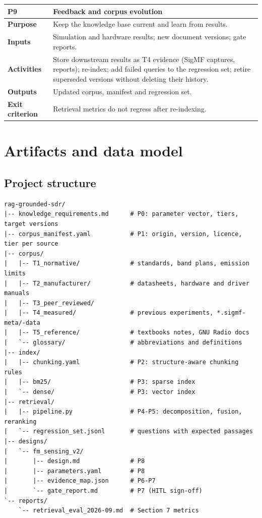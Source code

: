 \documentclass[11pt,a4paper]{article}
\begin{document}
\vspace{-2pt}
{\small
\begin{longtable}{>{\raggedright\arraybackslash}p{}>{\raggedright\arraybackslash}p{}}
\toprule
\rowcolor{headbg} \textbf{P9} & \textbf{Feedback and corpus evolution} \\
\midrule
\endfirsthead
\bottomrule
\endlastfoot
\textbf{Purpose} & Keep the knowledge base current and learn from results. \\ \arrayrulecolor{rulec}\hline\arrayrulecolor{black}
\textbf{Inputs} & Simulation and hardware results; new document versions; gate reports. \\ \arrayrulecolor{rulec}\hline\arrayrulecolor{black}
\textbf{Activities} & Store downstream results as T4 evidence (SigMF captures, reports); re-index; add failed queries to the regression set; retire superseded versions without deleting their history. \\ \arrayrulecolor{rulec}\hline\arrayrulecolor{black}
\textbf{Outputs} & Updated corpus, manifest and regression set. \\ \arrayrulecolor{rulec}\hline\arrayrulecolor{black}
\textbf{Exit criterion} & Retrieval metrics do not regress after re-indexing. \\
\end{longtable}
}
\vspace{-2pt}
\section{Artifacts and data model}
\subsection{Project structure}
\begin{lstlisting}
rag-grounded-sdr/
|-- knowledge_requirements.md      # P0: parameter vector, tiers, target versions
|-- corpus_manifest.yaml           # P1: origin, version, licence, tier per source
|-- corpus/
|   |-- T1_normative/              # standards, band plans, emission limits
|   |-- T2_manufacturer/           # datasheets, hardware and driver manuals
|   |-- T3_peer_reviewed/
|   |-- T4_measured/               # previous experiments, *.sigmf-meta/-data
|   |-- T5_reference/              # textbooks notes, GNU Radio docs
|   `-- glossary/                  # abbreviations and definitions
|-- index/
|   |-- chunking.yaml              # P2: structure-aware chunking rules
|   |-- bm25/                      # P3: sparse index
|   `-- dense/                     # P3: vector index
|-- retrieval/
|   |-- pipeline.py                # P4-P5: decomposition, fusion, reranking
|   `-- regression_set.jsonl       # questions with expected passages
|-- designs/
|   `-- fm_sensing_v2/
|       |-- design.md              # P8
|       |-- parameters.yaml        # P8
|       |-- evidence_map.json      # P6-P7
|       `-- gate_report.md         # P7 (HITL sign-off)
`-- reports/
    `-- retrieval_eval_2026-09.md  # Section 7 metrics
\end{lstlisting}
\end{document}
